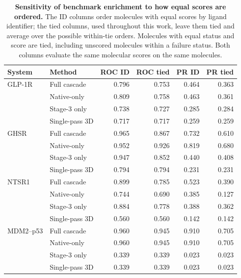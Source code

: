 \begin{table}[tbp]
\centering
\caption{\textbf{Sensitivity of benchmark enrichment to how equal scores are ordered.} The ID columns order molecules with equal scores by ligand identifier; the tied columns, used throughout this work, leave them tied and average over the possible within-tie orders. Molecules with equal status and score are tied, including unscored molecules within a failure status. Both columns evaluate the same molecular scores on the same molecules.}
\label{tab:identifier_ties}
\footnotesize
\setlength{\tabcolsep}{4pt}
\begin{tabular}{@{}llrrrr@{}}
\toprule
System & Method & ROC ID & ROC tied & PR ID & PR tied \\
\midrule
GLP-1R & Full cascade & 0.796 & 0.753 & 0.464 & 0.363 \\
 & Native-only & 0.809 & 0.758 & 0.463 & 0.361 \\
 & Stage-3 only & 0.738 & 0.727 & 0.285 & 0.284 \\
 & Single-pass 3D & 0.717 & 0.717 & 0.259 & 0.259 \\
GHSR & Full cascade & 0.965 & 0.867 & 0.732 & 0.610 \\
 & Native-only & 0.952 & 0.926 & 0.819 & 0.680 \\
 & Stage-3 only & 0.947 & 0.852 & 0.440 & 0.408 \\
 & Single-pass 3D & 0.794 & 0.794 & 0.231 & 0.231 \\
NTSR1 & Full cascade & 0.899 & 0.785 & 0.523 & 0.390 \\
 & Native-only & 0.744 & 0.690 & 0.385 & 0.127 \\
 & Stage-3 only & 0.884 & 0.778 & 0.388 & 0.362 \\
 & Single-pass 3D & 0.560 & 0.560 & 0.142 & 0.142 \\
MDM2--p53 & Full cascade & 0.960 & 0.945 & 0.910 & 0.705 \\
 & Native-only & 0.960 & 0.945 & 0.910 & 0.705 \\
 & Stage-3 only & 0.339 & 0.339 & 0.023 & 0.023 \\
 & Single-pass 3D & 0.339 & 0.339 & 0.023 & 0.023 \\
\bottomrule
\end{tabular}
\end{table}
